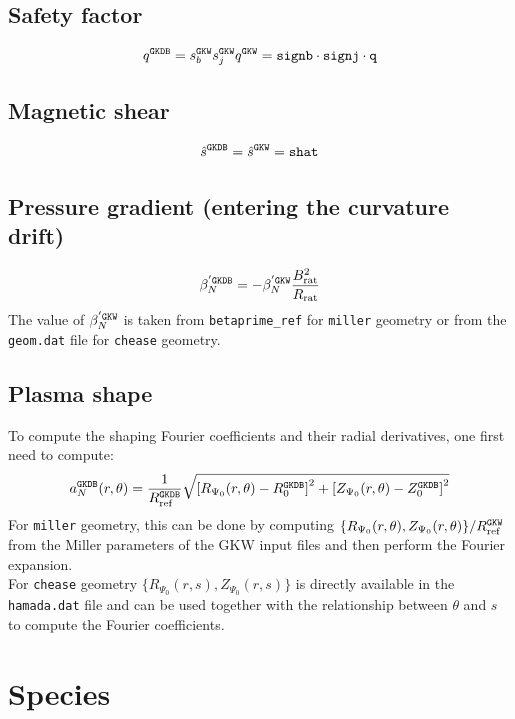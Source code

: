 \documentclass[a4paper]{report}
\begin{document}
\subsection{Safety factor}
\begin{equation}
q^{\texttt{GKDB}} = s_b^{\texttt{GKW}} s_j^{\texttt{GKW}} q^{\texttt{GKW}} = \texttt{signb}\cdot\texttt{signj}\cdot\texttt{q}
\end{equation}

\subsection{Magnetic shear}
\begin{equation}
\hat{s}^{\texttt{GKDB}} = \hat{s}^{\texttt{GKW}} = \texttt{shat}
\end{equation}

\subsection{Pressure gradient (entering the curvature drift)}
\begin{equation}
\beta^{' \texttt{GKDB}}_N = - \beta^{' \texttt{GKW}}_N \frac{B_\textrm{rat}^2}{R_\textrm{rat}}
\end{equation}
The value of $\beta^{' \texttt{GKW}}_N $ is taken from \texttt{betaprime\_ref} for \texttt{miller} geometry or from the \texttt{geom.dat} file for \texttt{chease} geometry.

\subsection{Plasma shape}
To compute the shaping Fourier coefficients and their radial derivatives, one first need to compute:
\begin{equation}
 a_N^{\texttt{GKDB}}(r,\theta)=\frac{1}{R_{\textrm{ref}}^{\texttt{GKDB}}}\sqrt{\left[R_{\Psi_0}(r,\theta)-R_0^{\texttt{GKDB}}\right]^2 + \left[Z_{\Psi_0}(r,\theta)-Z_0^{\texttt{GKDB}}\right]^2} 
\end{equation}
For \texttt{miller} geometry, this can be done by computing $\{R_{\Psi_0}(r,\theta),Z_{\Psi_0}(r,\theta)\}/R_{\textrm{ref}}^{\texttt{GKW}}$ from the Miller parameters of the GKW input files and then perform the Fourier expansion.\\
For \texttt{chease} geometry $\{R_{\Psi_0}(r,s),Z_{\Psi_0}(r,s)\}$ is directly available in the \texttt{hamada.dat} file and can be used together with the relationship between $\theta$ and $s$ to compute the Fourier coefficients. 

\section{Species}
\end{document}
